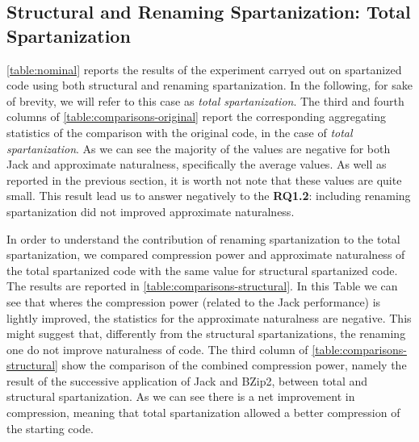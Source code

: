 \subsection{Structural and Renaming Spartanization: Total Spartanization}

\cref{table:nominal} reports the results of the experiment carryed out on
spartanized code using both structural and renaming spartanization.
In the following, for sake of brevity, we will refer to this case as \emph{total spartanization}.
The third and fourth columns of \cref{table:comparisons-original} report the corresponding
aggregating statistics of the comparison with the original code, in the case of
\emph{total spartanization}.
As we can see the majority of the values are negative for both Jack and approximate naturalness,
specifically the average values. As well as reported in the previous section, it is worth not note that
these values are quite small.
This result lead us to answer negatively to the \textbf{RQ1.2}: including renaming spartanization
did not improved approximate naturalness.

In order to understand the contribution of renaming spartanization to the total spartanization,
we compared compression power and approximate naturalness of the total spartanized code
with the same value for structural spartanized code.
The results are reported in \cref{table:comparisons-structural}. In this Table we
can see that wheres the compression power (related to the Jack performance)
is lightly improved, the statistics for the approximate naturalness are negative.
This might suggest that, differently from the structural spartanizations, the renaming one
do not improve naturalness of code.
The third column of \cref{table:comparisons-structural} show the comparison of the combined
compression power, namely the result of the successive application of Jack and BZip2,
between total and structural spartanization. As we can see there is a net improvement in
compression, meaning that total spartanization allowed a better compression of the starting code.

